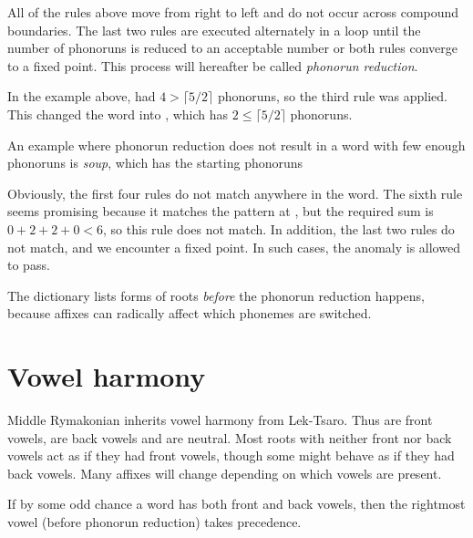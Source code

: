 \documentclass{book}
\newcommand{\lname}{Middle Rymakonian}
\begin{document}
All of the rules above move from right to left and do not occur across compound boundaries. The last two rules are executed alternately in a loop until the number of phonoruns is reduced to an acceptable number or both rules converge to a fixed point. This process will hereafter be called \emph{phonorun reduction}.

In the example above,  had $4 > \lceil 5 / 2 \rceil$ phonoruns, so the third rule was applied. This changed the word into , which has $2 \le \lceil 5 / 2 \rceil$ phonoruns.

An example where phonorun reduction does not result in a word with few enough phonoruns is  \emph{soup}, which has the starting phonoruns

\begin{center}
\end{center}

Obviously, the first four rules do not match anywhere in the word. The sixth rule seems promising because it matches the pattern at , but the required sum is $0 + 2 + 2 + 0 < 6$, so this rule does not match. In addition, the last two rules do not match, and we encounter a fixed point. In such cases, the anomaly is allowed to pass.

The dictionary lists forms of roots \emph{before} the phonorun reduction happens, because affixes can radically affect which phonemes are switched.

\section{Vowel harmony}

\lname{} inherits vowel harmony from Lek-Tsaro. Thus  are front vowels,  are back vowels and  are neutral. Most roots with neither front nor back vowels act as if they had front vowels, though some might behave as if they had back vowels. Many affixes will change depending on which vowels are present.

If by some odd chance a word has both front and back vowels, then the rightmost vowel (before phonorun reduction) takes precedence.
\end{document}
